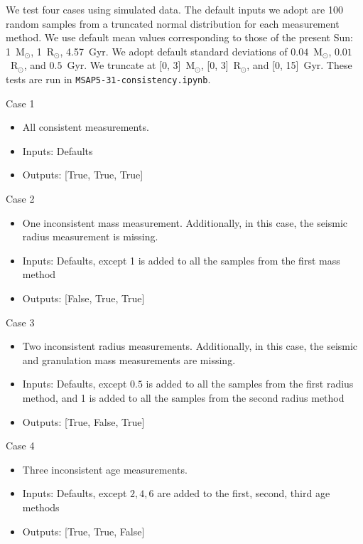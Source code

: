 \documentclass[a4paper, oneside, 11pt, article, english]{memoir}
\begin{document}
We test four cases using simulated data. The default inputs we adopt are 100 random samples from a truncated normal distribution for each measurement method. We use default mean values corresponding to those of the present Sun: 1~M$_\odot$, 1~R$_\odot$, 4.57~Gyr. We adopt default standard deviations of $0.04$~M$_\odot$, $0.01$~R$_\odot$, and $0.5$~Gyr. We truncate at [0, 3]~M$_\odot$, [0, 3]~R$_\odot$, and [0, 15]~Gyr. These tests are run in \texttt{MSAP5-31-consistency.ipynb}. 

Case 1
  \begin{itemize}
      \firmlist
      \item All consistent measurements. 
      \item Inputs: Defaults
      \item Outputs: [True, True, True]
  \end{itemize}

Case 2
  \begin{itemize}
      \firmlist
      \item One inconsistent mass measurement. Additionally, in this case, the seismic radius measurement is missing.
      \item Inputs: Defaults, except 1 is added to all the samples from the first mass method
      \item Outputs: [False, True, True]
  \end{itemize}

Case 3
  \begin{itemize}
      \firmlist
      \item Two inconsistent radius measurements. Additionally, in this case, the seismic and granulation mass measurements are missing. 
      \item Inputs: Defaults, except $0.5$ is added to all the samples from the first radius method, and 1 is added to all the samples from the second radius method
      \item Outputs: [True, False, True]
  \end{itemize}

Case 4
  \begin{itemize}
      \firmlist
      \item Three inconsistent age measurements. 
      \item Inputs: Defaults, except $2,4,6$ are added to the first, second, third age methods 
      \item Outputs: [True, True, False]
  \end{itemize}
\end{document}

